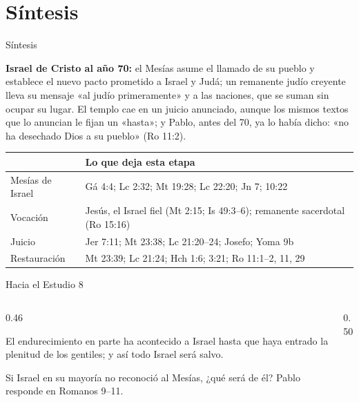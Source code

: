 \section{Síntesis}
\begin{frame}{Síntesis}
\begin{tcolorbox}[colback=piedra,colframe=ladrillo,boxrule=1pt,arc=3pt,fontupper=\small]
\textbf{\textcolor{cafe}{Israel de Cristo al año 70:}} el Mesías asume el llamado de su pueblo y establece el nuevo pacto prometido a Israel y Judá; un remanente judío creyente lleva su mensaje «al judío primeramente» y a las naciones, que se suman sin ocupar su lugar. El templo cae en un juicio anunciado, aunque los mismos textos que lo anuncian le fijan un «hasta»; y Pablo, antes del 70, ya lo había dicho: «no ha desechado Dios a su pueblo» (Ro 11:2).
\end{tcolorbox}
\centering\scriptsize\renewcommand{\arraystretch}{1.25}
\begin{tabular}{>{\RaggedRight\arraybackslash}p{3.0cm}>{\RaggedRight\arraybackslash}p{8.6cm}}
\toprule
{\color{ladrillo}\bfseries Eje} & {\color{ladrillo}\bfseries Lo que deja esta etapa}\\\midrule
Mesías de Israel & Gá 4:4; Lc 2:32; Mt 19:28; Lc 22:20; Jn 7; 10:22\\
Vocación & Jesús, el Israel fiel (Mt 2:15; Is 49:3--6); remanente sacerdotal (Ro 15:16)\\
Juicio & Jer 7:11; Mt 23:38; Lc 21:20--24; Josefo; Yoma 9b\\
Restauración & Mt 23:39; Lc 21:24; Hch 1:6; 3:21; Ro 11:1--2, 11, 29\\
\bottomrule
\end{tabular}
\elabpropia
\end{frame}

\begin{frame}{Hacia el Estudio 8}
\begin{columns}[T,onlytextwidth]
\begin{column}{0.46\textwidth}
\begin{cita}El endurecimiento en parte ha acontecido a Israel hasta que haya entrado la plenitud de los gentiles; y así todo Israel será salvo.\end{cita}
\footnotesize Si Israel en su mayoría no reconoció al Mesías, ¿qué será de él? Pablo responde en Romanos 9--11.
\end{column}
\begin{column}{0.50\textwidth}
\centering
{}
\elabpropia
\end{column}
\end{columns}
\end{frame}

